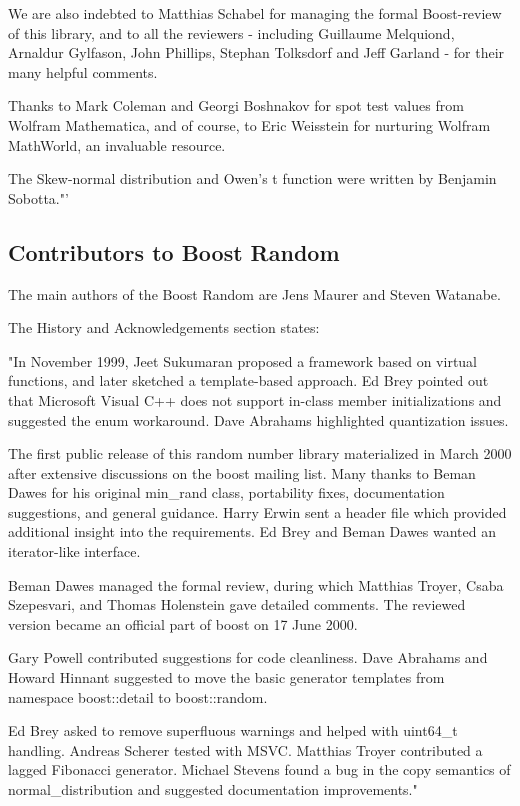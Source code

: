 \vpara
We are also indebted to Matthias Schabel for managing the formal Boost-review of this library, and to all the reviewers - including Guillaume Melquiond, Arnaldur Gylfason, John Phillips, Stephan Tolksdorf and Jeff Garland - for their many helpful comments.

\vpara
Thanks to Mark Coleman and Georgi Boshnakov for spot test values from Wolfram Mathematica, and of course, to Eric Weisstein for nurturing Wolfram MathWorld, an invaluable resource.

\vpara
The Skew-normal distribution and Owen's t function were written by Benjamin Sobotta."'




\subsection{Contributors to Boost Random}
\label{Contributors to Boost Random}
The main authors of the Boost Random are Jens Maurer and Steven Watanabe.

\vpara
The History and Acknowledgements section states:

\vpara
"In November 1999, Jeet Sukumaran proposed a framework based on virtual functions, and later sketched a template-based approach. Ed Brey pointed out that Microsoft Visual C++ does not support in-class member initializations and suggested the enum workaround. Dave Abrahams highlighted quantization issues. 

\vpara
The first public release of this random number library materialized in March 2000 after extensive discussions on the boost mailing list. Many thanks to Beman Dawes for his original min\_rand class, portability fixes, documentation suggestions, and general guidance. Harry Erwin sent a header file which provided additional insight into the requirements. Ed Brey and Beman Dawes wanted an iterator-like interface. 

\vpara
Beman Dawes managed the formal review, during which Matthias Troyer, Csaba Szepesvari, and Thomas Holenstein gave detailed comments. The reviewed version became an official part of boost on 17 June 2000. 

\vpara
Gary Powell contributed suggestions for code cleanliness. Dave Abrahams and Howard Hinnant suggested to move the basic generator templates from namespace boost::detail to boost::random. 

\vpara
Ed Brey asked to remove superfluous warnings and helped with uint64\_t handling. Andreas Scherer tested with MSVC. Matthias Troyer contributed a lagged Fibonacci generator. Michael Stevens found a bug in the copy semantics of normal\_distribution and suggested documentation improvements."







